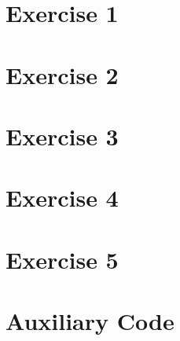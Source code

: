 \documentclass[a4paper,11pt]{article}
\begin{document}


%

\section{Exercise 1}


\section{Exercise 2}


\section{Exercise 3}


\section{Exercise 4}


\section{Exercise 5}


\section{Auxiliary Code}

\end{document}
